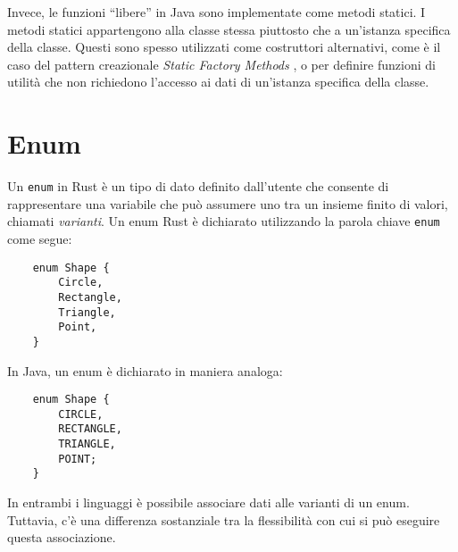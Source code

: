 Invece, le funzioni ``libere'' in Java sono implementate come metodi statici. I metodi statici appartengono alla classe stessa piuttosto che a un'istanza specifica della classe. Questi sono spesso utilizzati come costruttori alternativi, come è il caso del pattern creazionale \textit{Static Factory Methods} \cite{gamma-design-patterns}, o per definire funzioni di utilità che non richiedono l'accesso ai dati di un'istanza specifica della classe. 
\section{Enum}
\label{sec:enums}
Un \texttt{enum} in Rust è un tipo di dato definito dall'utente che consente di rappresentare una variabile che può assumere uno tra un insieme finito di valori, chiamati \textit{varianti}. Un enum Rust è dichiarato utilizzando la parola chiave \texttt{enum} come segue:
\begin{verbatim}
    enum Shape {
        Circle,
        Rectangle,
        Triangle,
        Point,  
    }
\end{verbatim}
In Java, un enum è dichiarato in maniera analoga:
\begin{verbatim}
    enum Shape {
        CIRCLE,
        RECTANGLE,
        TRIANGLE,
        POINT; 
    }
\end{verbatim}
In entrambi i linguaggi è possibile associare dati alle varianti di un enum. Tuttavia, c'è una differenza sostanziale tra la flessibilità con cui si può eseguire questa associazione.
